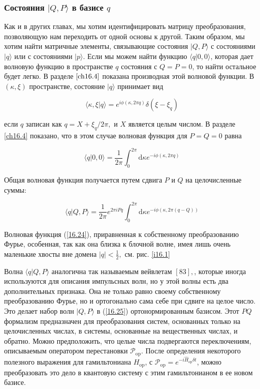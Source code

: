\documentclass[main.tex]{subfiles}
\begin{document}
\subsubsection{Состояния $|Q,P\rangle$ в базисе $q$}\label{ch16.1.2}

Как и в других главах, мы хотим идентифицировать матрицу преобразования, позволяющую нам переходить от одной основы к другой. Таким образом, мы хотим найти матричные элементы, связывающие состояния $| Q, P\rangle$ с состояниями $| q\rangle$ или с состояниями $| p\rangle$. Если мы можем найти функцию $\langle q | 0,0\rangle$, которая дает волновую функцию в пространстве $q$ состояния с $Q = P = 0$, то найти остальное будет легко. В разделе $\ref{ch16.4}$ показана производная этой волновой функции. В $(\kappa, \xi)$ пространстве, состояние $|q\rangle$ принимает вид

\begin{equation}\label{16.23} 
\langle\kappa, \xi | q\rangle= e^{i \phi(\kappa, 2 \pi q)} \delta\left(\xi-\xi_{q}\right)
\end{equation}

если $q$ записан как $q=X+\xi_{q} / 2 \pi,$ и $X$ является целым числом. В разделе \ref{ch16.4} показано, что в этом случае волновая функция для $P=Q=0$ равна

\begin{equation}\label{16.24} 
\langle q | 0,0\rangle=\frac{1}{2 \pi} \int_{0}^{2 \pi} \mathrm{d} \kappa e^{-i \phi(\kappa, 2 \pi q)}
\end{equation}

Общая волновая функция получается путем сдвига $P$ и $Q$ на целочисленные суммы:

\begin{equation}\label{16.25} 
\langle q | Q, P\rangle=\frac{1}{2 \pi} e^{2 \pi i P q} \int_{0}^{2 \pi} \mathrm{d} \kappa e^{-i \phi(\kappa, 2 \pi(q-Q))}
\end{equation}

Волновая функция (\ref{16.24}), приравненная к собственному преобразованию Фурье, особенная, так как она близка к блочной волне, имея лишь очень маленькие хвосты вне домена $|q|<\frac{1}{2},$ см. рис. \ref{i16.1}

Волна $\langle q | Q, P\rangle$ аналогична так называемым вейвлетам $[83],$, которые иногда используются для описания импульсных волн, но у этой волны есть два дополнительных признака. Она не только равно своему собственному преобразованию Фурье, но и ортогонально сама себе при сдвиге на целое число. Это делает набор волн $|Q, P\rangle$ в (\ref{16.25}) ортонормированным базисом. Этот $P Q$ формализм предназначен для преобразования систем, основанных только на целочисленных числах, в системы, основанные на вещественных числах, и обратно. Можно предположить, что целые числа подвергаются переключениям, описываемым оператором перестановки $\mathcal{P}_{\mathrm{op}}$. После определения некоторого полезного выражения для гамильтониана $H_{\mathrm{op}}$, с $\mathcal{P}_{\mathrm{op}}=e^{-i \hat{H}_{\mathrm{op}} \delta t}$, можно преобразовать это дело в квантовую систему с этим гамильтонианом в ее новом базисе. 
\end{document}
